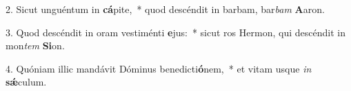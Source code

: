 2. Sicut unguéntum in \textbf{cá}pite,~*  quod descéndit in barbam, bar\textit{bam} \textbf{A}aron.\

3. Quod descéndit in oram vestiménti \textbf{e}jus:~*  sicut ros Hermon, qui descéndit in mon\textit{tem} \textbf{Si}on.\

4. Quóniam illic mandávit Dóminus benedicti\textbf{ó}nem,~*  et vitam usque \textit{in} \textbf{sǽ}culum.\

